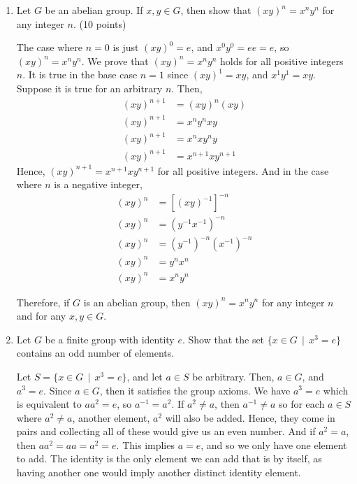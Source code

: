 \begin{enumerate}
    \item Let \(G\) be an abelian group. If \(x,y\in G\), then show that \((xy)^n = x^ny^n\) for any integer \(n\). (10 points)

    The case where \(n = 0\) is just \((xy)^0 = e\), and \(x^0y^0 = ee = e\), so \((xy)^n = x^ny^n\). We prove that \((xy)^n = x^ny^n\) holds for all positive integers \(n\). It is true in the base case \(n = 1\) since \((xy)^1 = xy\), and \(x^1y^1 = xy\). Suppose it is true for an arbitrary \(n\). Then,
    \begin{align*}
        (xy)^{n + 1} &= (xy)^n (xy) \\
        (xy)^{n + 1} &= x^ny^nxy \\
        (xy)^{n + 1} &= x^nxy^ny \\
        (xy)^{n + 1} &= x^{n+1}xy^{n+1}
    \end{align*}
    Hence, \((xy)^{n + 1} = x^{n+1}xy^{n+1}\) for all positive integers. And in the case where \(n\) is a negative integer,
    \begin{align*}
        (xy)^n &= \left[(xy)^{-1}\right]^{-n} \\
        (xy)^n &= \left(y^{-1}x^{-1}\right)^{-n} \\
        (xy)^n &= (y^{-1})^{-n}(x^{-1})^{-n} \\
        (xy)^n &= y^nx^n \\
        (xy)^n &= x^ny^n
    \end{align*}

    Therefore, if \(G\) is an abelian group, then \((xy)^n = x^ny^n\) for any integer \(n\) and for any \(x,y\in G\).

    \item Let \(G\) be a finite group with identity \(e\). Show that the set \(\{x\in G \,\mid\, x^{3} = e\}\) contains an odd number of elements.

    Let \(S = \{x\in G \,\mid\, x^{3} = e\}\), and let \(a\in S\) be arbitrary. Then, \(a\in G\), and \(a^3 = e\). Since \(a\in G\), then it satisfies the group axioms. We have \(a^3 = e\) which is equivalent to \(aa^2 = e\), so \(a^{-1} = a^2\). If \(a^2 \neq a\), then \(a^{-1} \neq a\) so for each \(a\in S\) where \(a^{2} \neq a\), another element, \(a^2\) will also be added. Hence, they come in pairs and collecting all of these would give us an even number. And if \(a^2 = a\), then \(aa^2 = aa = a^2 = e\). This implies \(a = e\), and so we only have one element to add. The identity is the only element we can add that is by itself, as having another one would imply another distinct identity element.


\end{enumerate}
